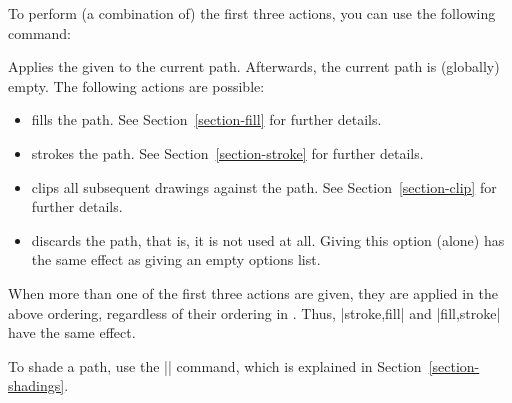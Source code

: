 To perform (a combination of) the first three actions, you can use the
following command:
\begin{command}{\pgfusepath{}}
  Applies the given  to the current path. Afterwards,
  the current path is (globally) empty. The following actions are
  possible:
  \begin{itemize}
  \item {}
    fills the path. See Section~\ref{section-fill} for further details.
\begin{codeexample}[]
\begin{pgfpicture}
  \pgfpathmoveto{\pgfpointorigin}
  \pgfpathlineto{\pgfpoint{1cm}{1cm}}
  \pgfpathlineto{\pgfpoint{1cm}{0cm}}
\end{pgfpicture}
\end{codeexample}
  \item {}
    strokes the path. See Section~\ref{section-stroke} for further details.
\begin{codeexample}[]
\begin{pgfpicture}
  \pgfpathmoveto{\pgfpointorigin}
  \pgfpathlineto{\pgfpoint{1cm}{1cm}}
  \pgfpathlineto{\pgfpoint{1cm}{0cm}}
\end{pgfpicture}
\end{codeexample}
  \item {}
    clips all subsequent drawings against the path. See
    Section~\ref{section-clip} for further details.
\begin{codeexample}[]
\begin{pgfpicture}
  \pgfpathmoveto{\pgfpointorigin}
  \pgfpathlineto{\pgfpoint{1cm}{1cm}}
  \pgfpathlineto{\pgfpoint{1cm}{0cm}}
  \pgfpathcircle{\pgfpoint{1cm}{1cm}}{0.5cm}
\end{pgfpicture}
\end{codeexample}
  \item {}
    discards the path, that is, it is not used at all. Giving this
    option (alone) has the same effect as giving an empty options
    list.
  \end{itemize}
  When more than one of the first three actions are given, they are
  applied in the above ordering, regardless of their ordering in
  . Thus, |{stroke,fill}| and |{fill,stroke}| have the
  same effect.
\end{command}

To shade a path, use the |\pgfshadepath| command, which is explained
in Section~\ref{section-shadings}.



